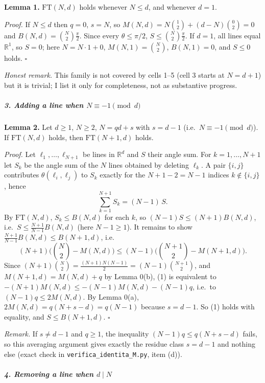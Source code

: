 \documentclass[11pt,a4paper]{article}
\begin{document}
\textbf{Lemma 1.} \(\mathrm{FT}(N,d)\) holds whenever \(N\le d\), and
whenever \(d=1\).

\emph{Proof.} If \(N\le d\) then \(q=0\), \(s=N\), so
\(M(N,d)=N\binom12+(d-N)\binom02=0\) and \(B(N,d)=\binom N2\frac\pi2\).
Since every \(\theta\le\pi/2\), \(S\le\binom N2\frac\pi2\). If \(d=1\),
all lines equal \(\mathbb R^1\), so \(S=0\); here \(N=N\cdot1+0\),
\(M(N,1)=\binom N2\), \(B(N,1)=0\), and \(S\le0\) holds. \(\square\)

\emph{Honest remark.} This family is not covered by cells 1--5 (cell 3
starts at \(N=d+1\)) but it is trivial; I list it only for completeness,
not as substantive progress.

\subparagraph{\texorpdfstring{3. Adding a line when
\(N\equiv-1\pmod d\)}{3. Adding a line when N\textbackslash equiv-1\textbackslash pmod d}}\label{adding-a-line-when-nequiv-1pmod-d}

\textbf{Lemma 2.} Let \(d\ge1\), \(N\ge2\), \(N=qd+s\) with \(s=d-1\)
(i.e.~\(N\equiv-1\pmod d\)). If \(\mathrm{FT}(N,d)\) holds, then
\(\mathrm{FT}(N+1,d)\) holds.

\emph{Proof.} Let \(\ell_1,\dots,\ell_{N+1}\) be lines in
\(\mathbb R^d\) and \(S\) their angle sum. For \(k=1,\dots,N+1\) let
\(S_k\) be the angle sum of the \(N\) lines obtained by deleting
\(\ell_k\). A pair \(\{i,j\}\) contributes \(\theta(\ell_i,\ell_j)\) to
\(S_k\) exactly for the \(N+1-2=N-1\) indices \(k\notin\{i,j\}\), hence
\[\sum_{k=1}^{N+1}S_k=(N-1)\,S.\] By \(\mathrm{FT}(N,d)\),
\(S_k\le B(N,d)\) for each \(k\), so \((N-1)S\le(N+1)B(N,d)\),
i.e.~\(S\le\frac{N+1}{N-1}B(N,d)\) (here \(N-1\ge1\)). It remains to
show \(\frac{N+1}{N-1}B(N,d)\le B(N+1,d)\), i.e.
\[(N+1)\Big(\binom N2-M(N,d)\Big)\le(N-1)\Big(\binom{N+1}2-M(N+1,d)\Big).\tag{1}\]
Since \((N+1)\binom N2=\frac{(N+1)N(N-1)}2=(N-1)\binom{N+1}2\), and
\(M(N+1,d)=M(N,d)+q\) by Lemma 0(b), (1) is equivalent to
\(-(N+1)M(N,d)\le-(N-1)M(N,d)-(N-1)q\), i.e.~to \((N-1)q\le2M(N,d)\). By
Lemma 0(a), \(2M(N,d)=q(N+s-d)=q(N-1)\) because \(s=d-1\). So (1) holds
with equality, and \(S\le B(N+1,d)\). \(\square\)

\emph{Remark.} If \(s\ne d-1\) and \(q\ge1\), the inequality
\((N-1)q\le q(N+s-d)\) fails, so this averaging argument gives exactly
the residue class \(s=d-1\) and nothing else (exact check in
\texttt{verifica\_identita\_M.py}, item (d)).

\subparagraph{\texorpdfstring{4. Removing a line when
\(d\mid N\)}{4. Removing a line when d\textbackslash mid N}}\label{removing-a-line-when-dmid-n}
\end{document}
